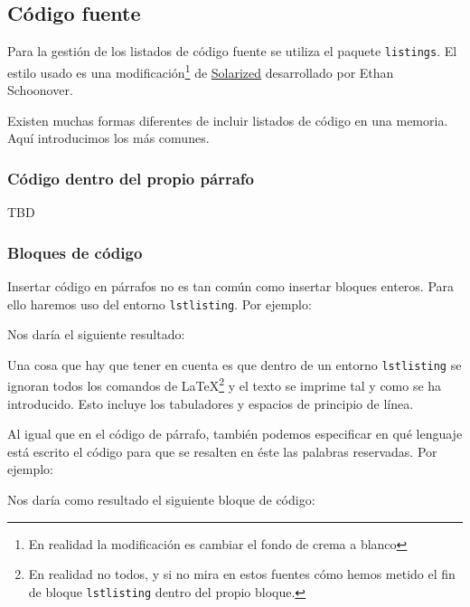 \subsection{Código fuente}

Para la gestión de los listados de código fuente se utiliza el paquete \texttt{listings}. El estilo usado es una modificación\footnote{En realidad la modificación es cambiar el fondo de crema a blanco} de \href{https://ethanschoonover.com/solarized/}{Solarized} desarrollado por Ethan Schoonover.

Existen muchas formas diferentes de incluir listados de código en una memoria. Aquí introducimos los más comunes.

\subsubsection{Código dentro del propio párrafo}

TBD

\subsubsection{Bloques de código}

Insertar código en párrafos no es tan común como insertar bloques enteros. Para ello haremos uso del entorno \texttt{lstlisting}. Por ejemplo:



Nos daría el siguiente resultado:



Una cosa que hay que tener en cuenta es que dentro de un entorno \texttt{lstlisting} se ignoran todos los comandos de \LaTeX\space\footnote{En realidad no todos, y si no mira en estos fuentes cómo hemos metido el fin de bloque \texttt{lstlisting} dentro del propio bloque.} y el texto se imprime tal y como se ha introducido. Esto incluye los tabuladores y espacios de principio de línea.

Al igual que en el código de párrafo, también podemos especificar en qué lenguaje está escrito el código para que se resalten en éste las palabras reservadas. Por ejemplo:



Nos daría como resultado el siguiente bloque de código:
 
